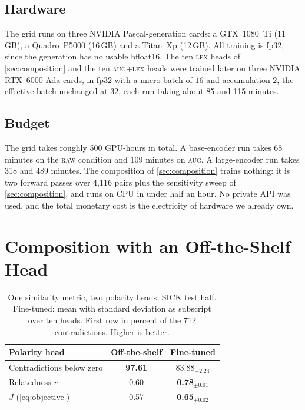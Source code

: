 \documentclass[11pt]{article}
\begin{document}
\subsection{Hardware}

The grid runs on three NVIDIA Pascal-generation cards: a GTX~1080~Ti (11\,GB), a Quadro~P5000 (16\,GB) and a Titan~Xp (12\,GB).
All training is fp32, since the generation has no usable bfloat16.
The ten \textsc{lex} heads of \autoref{sec:composition} and the ten \textsc{aug+lex} heads were trained later on three NVIDIA RTX~6000 Ada cards, in fp32 with a micro-batch of $16$ and accumulation $2$, the effective batch unchanged at $32$, each run taking about 85 and 115 minutes.

\subsection{Budget}

The grid takes roughly 500 GPU-hours in total.
A base-encoder run takes 68 minutes on the \textsc{raw} condition and 109 minutes on \textsc{aug}. A large-encoder run takes 318 and 489 minutes.
The composition of \autoref{sec:composition} trains nothing: it is two forward passes over 4{,}116 pairs plus the sensitivity sweep of \autoref{sec:composition}, and runs on CPU in under half an hour.
No private API was used, and the total monetary cost is the electricity of hardware we already own.

\section{Composition with an Off-the-Shelf Head}
\label{an:zeroshot}

\begin{table}[t]
\centering\small
\begin{tabular}{l cc}
\toprule
Polarity head & Off-the-shelf & Fine-tuned \\
\midrule
Contradictions below zero & \textbf{97.61} & 83.88$_{\pm 2.24}$ \\
Relatedness $r$ & 0.60 & \textbf{0.78$_{\pm 0.01}$} \\
$J$ (\autoref{eq:objective}) & 0.57 & \textbf{0.65$_{\pm 0.02}$} \\
\bottomrule
\end{tabular}
\caption{One similarity metric, two polarity heads, SICK test half. Fine-tuned: mean with standard deviation as subscript over ten heads. First row in percent of the 712 contradictions. Higher is better.}
\label{tab:zeroshot}
\end{table}
\end{document}
